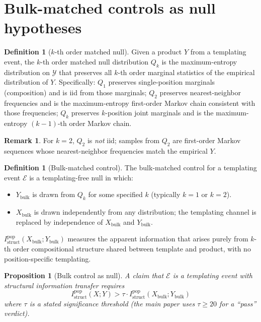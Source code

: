 \documentclass[11pt]{article}
\theoremstyle{plain}
\newtheorem{proposition}[theorem]{Proposition}
\theoremstyle{definition}
\newtheorem{definition}[theorem]{Definition}
\newtheorem{remark}[theorem]{Remark}
\newcommand{\Istructpop}{I_{\mathrm{struct}}^{\mathrm{pop}}}
\begin{document}
\section{Bulk-matched controls as null hypotheses}

\begin{definition}[$k$-th order matched null]
Given a product $Y$ from a templating event, the $k$-th order matched null distribution $Q_k$ is the maximum-entropy distribution on $\mathcal{Y}$ that preserves all $k$-th order marginal statistics of the empirical distribution of $Y$. Specifically: $Q_1$ preserves single-position marginals (composition) and is iid from those marginals; $Q_2$ preserves nearest-neighbor frequencies and is the maximum-entropy first-order Markov chain consistent with those frequencies; $Q_k$ preserves $k$-position joint marginals and is the maximum-entropy $(k-1)$-th order Markov chain.
\end{definition}

\begin{remark}
For $k = 2$, $Q_2$ is \emph{not} iid; samples from $Q_2$ are first-order Markov sequences whose nearest-neighbor frequencies match the empirical $Y$.
\end{remark}

\begin{definition}[Bulk-matched control]
The bulk-matched control for a templating event $\mathcal{E}$ is a templating-free null in which:
\begin{itemize}
  \item $Y_{\mathrm{bulk}}$ is drawn from $Q_k$ for some specified $k$ (typically $k = 1$ or $k = 2$).
  \item $X_{\mathrm{bulk}}$ is drawn independently from any distribution; the templating channel is replaced by independence of $X_{\mathrm{bulk}}$ and $Y_{\mathrm{bulk}}$.
\end{itemize}
$\Istructpop(X_{\mathrm{bulk}}; Y_{\mathrm{bulk}})$ measures the apparent information that arises purely from $k$-th order compositional structure shared between template and product, with no position-specific templating.
\end{definition}

\begin{proposition}[Bulk control as null]
A claim that $\mathcal{E}$ is a templating event with structural information transfer requires
\[
\Istructpop(X; Y) > \tau \cdot \Istructpop(X_{\mathrm{bulk}}; Y_{\mathrm{bulk}})
\]
where $\tau$ is a stated significance threshold (the main paper uses $\tau \ge 20$ for a ``pass'' verdict).
\end{proposition}
\end{document}
